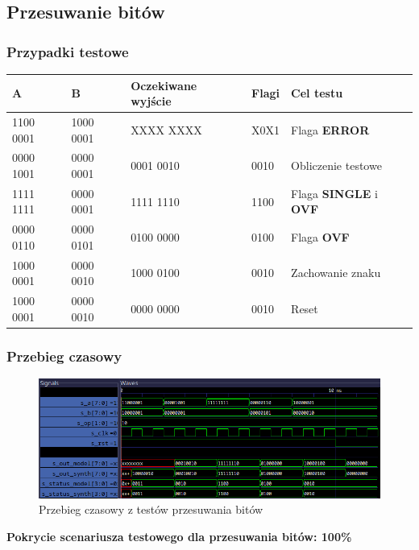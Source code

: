 \documentclass[12pt]{article}
\begin{document}
	\subsection*{Przesuwanie bitów}
	\subsubsection*{Przypadki testowe}
	\begin{table}[H]
		\centering
		\begin{tabular}{|l|l|l|l|l|}
			\hline
			\textbf{A} & \textbf{B} & \textbf{Oczekiwane wyjście} & \textbf{Flagi} & \textbf{Cel testu} \\ \hline
			1100 0001 & 1000 0001 & XXXX XXXX & X0X1 & Flaga \textbf{ERROR} \\ \hline
			0000 1001 & 0000 0001 & 0001 0010 & 0010 & Obliczenie testowe \\ \hline
			1111 1111 & 0000 0001 & 1111 1110 & 1100 & Flaga \textbf{SINGLE} i \textbf{OVF} \\ \hline
			0000 0110 & 0000 0101 & 0100 0000 & 0100 & Flaga \textbf{OVF} \\ \hline
			1000 0001 & 0000 0010 & 1000 0100 & 0010 & Zachowanie znaku \\ \hline
			1000 0001 & 0000 0010 & 0000 0000 & 0010 & Reset \\ \hline
		\end{tabular}
	\end{table}
	\subsubsection*{Przebieg czasowy}
	\begin{figure}[H]
		\begin{center}
			\includegraphics[width=\textwidth]{../Testy/Wyniki_testow/Testy_shl.png}
			\caption*{Przebieg czasowy z testów przesuwania bitów}
			\label{figure:test_shl}
		\end{center}
	\end{figure}
	\vspace{-20pt}
	\textbf{Pokrycie scenariusza testowego dla przesuwania bitów: 100\%}
	
\end{document}
